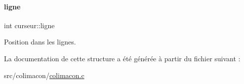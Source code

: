 \paragraph{\texorpdfstring{ligne}{ligne}}
{\footnotesize\ttfamily int curseur\+::ligne}



Position dans les lignes. 



La documentation de cette structure a été générée à partir du fichier suivant \+:\begin{DoxyCompactItemize}
\item 
src/colimacon/\hyperlink{colimacon_8c}{colimacon.\+c}\end{DoxyCompactItemize}
